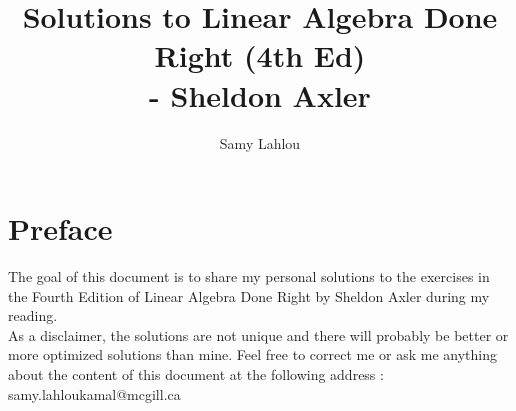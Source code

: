 \documentclass[12pt, oneside]{book}
\title{Solutions to Linear Algebra Done Right (4th Ed)
\\ - Sheldon Axler}
\author{Samy Lahlou}
\newcounter{exercise}[section] %
\begin{document}
\maketitle

\chapter*{Preface}

The goal of this document is to share my personal solutions to the exercises in the Fourth Edition of Linear Algebra Done Right by Sheldon Axler during my reading. \\ 
As a disclaimer, the solutions are not unique and there will probably be better or more optimized solutions than mine. Feel free to correct me or ask me anything about the content of this document at the following address : samy.lahloukamal@mcgill.ca

\tableofcontents








\end{document}
